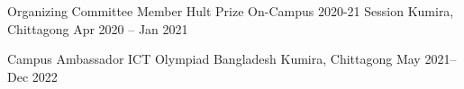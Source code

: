 

\begin{cventries}

  \cventry
    {Organizing Committee Member} %
    {Hult Prize On-Campus 2020-21 Session} %
    {Kumira, Chittagong} %
    {Apr 2020 – Jan 2021} %
    {
    }

  \cventry
    {Campus Ambassador} %
    {ICT Olympiad Bangladesh} %
    {Kumira, Chittagong} %
    {May 2021– Dec 2022} %
    {
    }


\end{cventries}
